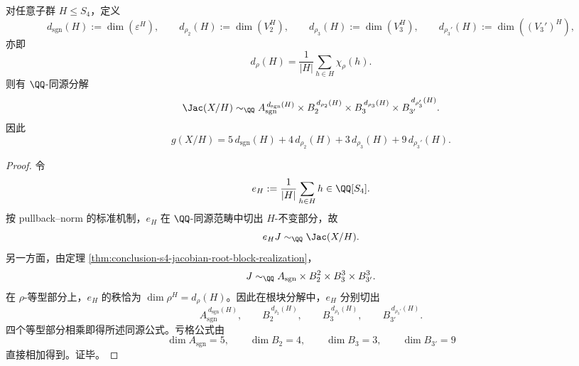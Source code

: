 \begin{theorem}[任意子群商的根块公式]\label{thm:conclusion-s4-arbitrary-subgroup-quotient-root-block-formula}
对任意子群 \(H\le S_4\)，定义
\[
d_{\mathrm{sgn}}(H):=\dim(\varepsilon^H),\qquad
d_{\rho_2}(H):=\dim(V_2^H),\qquad
d_{\rho_3}(H):=\dim(V_3^H),\qquad
d_{\rho_3'}(H):=\dim((V_3')^H),
\]
亦即
\[
d_\rho(H)=\frac{1}{|H|}\sum_{h\in H}\chi_\rho(h).
\]
则有 \(\QQ\)-同源分解
\[
\Jac(X/H)\sim_{\QQ}
A_{\mathrm{sgn}}^{\,d_{\mathrm{sgn}}(H)}
\times
B_2^{\,d_{\rho_2}(H)}
\times
B_3^{\,d_{\rho_3}(H)}
\times
B_{3'}^{\,d_{\rho_3'}(H)}.
\]
因此
\[
g(X/H)=
5\,d_{\mathrm{sgn}}(H)+
4\,d_{\rho_2}(H)+
3\,d_{\rho_3}(H)+
9\,d_{\rho_3'}(H).
\]
\end{theorem}
\begin{proof}
令
\[
e_H:=\frac{1}{|H|}\sum_{h\in H}h\in \QQ[S_4].
\]
按 pullback--norm 的标准机制，\(e_H\) 在 \(\QQ\)-同源范畴中切出 \(H\)-不变部分，故
\[
e_HJ\sim_{\QQ}\Jac(X/H).
\]
另一方面，由定理 \ref{thm:conclusion-s4-jacobian-root-block-realization}，
\[
J\sim_{\QQ}A_{\mathrm{sgn}}\times B_2^{2}\times B_3^{3}\times B_{3'}^{3}.
\]
在 \(\rho\)-等型部分上，\(e_H\) 的秩恰为 \(\dim \rho^H=d_\rho(H)\)。因此在根块分解中，\(e_H\) 分别切出
\[
A_{\mathrm{sgn}}^{\,d_{\mathrm{sgn}}(H)},\qquad
B_2^{\,d_{\rho_2}(H)},\qquad
B_3^{\,d_{\rho_3}(H)},\qquad
B_{3'}^{\,d_{\rho_3'}(H)}.
\]
四个等型部分相乘即得所述同源公式。亏格公式由
\[
\dim A_{\mathrm{sgn}}=5,\qquad \dim B_2=4,\qquad \dim B_3=3,\qquad \dim B_{3'}=9
\]
直接相加得到。证毕。
\end{proof}

